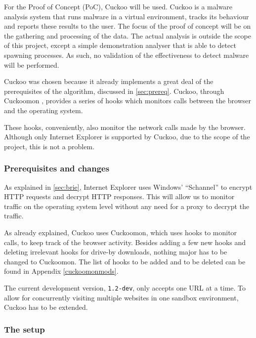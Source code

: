 
For the Proof of Concept (PoC), Cuckoo \cite{cuckoo} will be used. Cuckoo is a malware analysis system that runs malware in a virtual environment, tracks its behaviour and reports these results to the user. The focus of the proof of concept will be on the gathering and processing of the data. The actual analysis is outside the scope of this project, except a simple demonstration analyser that is able to detect spawning processes. As such, no validation of the effectiveness to detect malware will be performed. 

Cuckoo was chosen because it already implements a great deal of the prerequisites of the algorithm, discussed in \ref{sec:prereq}. Cuckoo, through Cuckoomon \cite{cuckoomon}, provides a series of hooks which monitors calls between the browser and the operating system.

These hooks, conveniently, also monitor the network calls made by the browser. Although only Internet Explorer is supported by Cuckoo, due to the scope of the project, this is not a problem.

\subsubsection{Prerequisites and changes}

As explained in \ref{sec:brie}, Internet Explorer uses Windows' ``Schannel'' \cite{schannel} to encrypt HTTP requests and decrypt HTTP responses. This will allow us to monitor traffic on the operating system level without any need for a proxy to decrypt the traffic.

As already explained, Cuckoo uses Cuckoomon, which uses hooks to monitor calls, to keep track of the browser activity. Besides adding a few new hooks and deleting irrelevant hooks for drive-by downloads, nothing major has to be changed to Cuckoomon. The list of hooks to be added and to be deleted can be found in Appendix \ref{cuckoomonmods}.

The current development version, \texttt{1.2-dev},  only accepts one URL at a time. To allow for concurrently visiting multiple websites in one sandbox environment, Cuckoo has to be extended.

\subsubsection{The setup}
\label{sec:setup}

